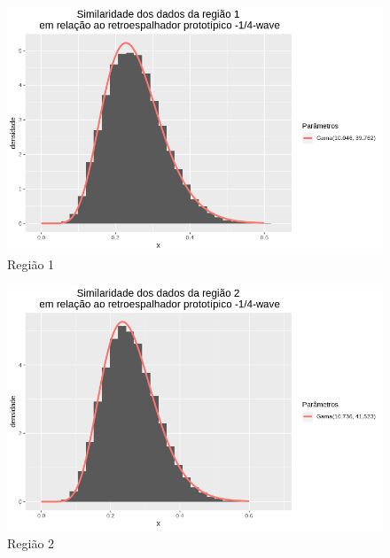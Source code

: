 \documentclass[12pt]{article}
\begin{document}
\begin{figure}[!h]
    \centering
    \includegraphics[width = \linewidth]{../../Images/Report_18_12_20/nwv_region1.png}
    \caption{Região 1}
    \label{fig:nwv_r1}
\end{figure}

\begin{figure}[!h]
    \centering
    \includegraphics[width = \linewidth]{../../Images/Report_18_12_20/nwv_region2.png}
    \caption{Região 2}
    \label{fig:nwv_r2}
\end{figure}
\end{document}
